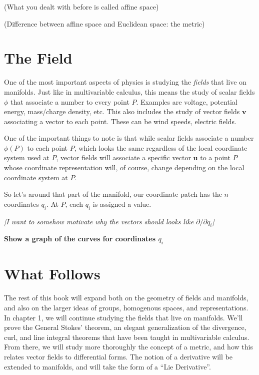 \documentclass[../master.tex]{subfiles}
\begin{document}
	(What you dealt with before is called affine space)
	
	(Difference between affine space and Euclidean space: the metric)
	
	
	
	\section{The Field} %
	\label{sec:the_field}
	
	One of the most important aspects of physics is studying the \emph{fields} that live on manifolds. Just like in multivariable calculus, this means the study of scalar fields $\phi$ that associate a number to every point $P$. Examples are voltage, potential energy, mass/charge density, etc. This also includes the study of vector fields $\mathbf v$ associating a vector to each point. These can be wind speeds, electric fields. 
	
	One of the important things to note is that while scalar fields associate a number $\phi(P)$ to each point $P$, which looks the same regardless of the local coordinate system used at $P$, vector fields will associate a specific vector $\mathbf u$ to a point $P$ whose coordinate representation will, of course, change depending on the local coordinate system at $P$.
	
	So let's around that part of the manifold, our coordinate patch has the $n$ coordinates $q_i$. At $P$, each $q_i$ is assigned a value. 
	
	{\emph{[I want to somehow motivate why the vectors should looks like $\partial/\partial q_i$]}}
	
	\textbf{Show a graph of the curves for coordinates $q_i$}
	
	\section{What Follows} %
	\label{sec:what_follows}
	
	The rest of this book will expand both on the geometry of fields and manifolds, and also on the larger ideas of groups, homogenous spaces, and representations. \\
	
	In chapter 1, we will continue studying the fields that live on manifolds. We'll prove the General Stokes' theorem, an elegant generalization of the divergence, curl, and line integral theorems that have been taught in multivariable calculus. From there, we will study more thoroughly the concept of a metric, and how this relates vector fields to differential forms. The notion of a derivative will be extended to manifolds, and will take the form of a ``Lie Derivative''.\\
	
\end{document}
